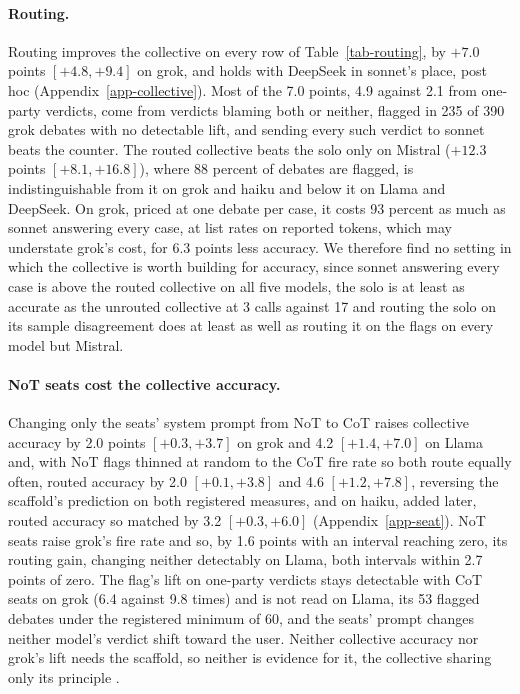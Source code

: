 \paragraph{Routing.}
Routing improves the collective on every row of Table~\ref{tab-routing}, by
$+7.0$ points $[+4.8, +9.4]$ on grok, and
holds with DeepSeek in sonnet's place, post hoc
(Appendix~\ref{app-collective}).
Most of the 7.0 points, 4.9 against 2.1 from one-party verdicts, come from
verdicts blaming both or neither, flagged in 235 of 390 grok debates with no
detectable lift, and sending every such verdict to sonnet beats the counter.
The routed collective beats the solo only on Mistral ($+12.3$
points $[+8.1, +16.8]$), where 88 percent of debates are flagged, is
indistinguishable from it on grok and haiku and below it on Llama and
DeepSeek.
On grok, priced at one debate per case, it costs 93 percent as much as
sonnet answering every case, at list rates on reported tokens, which may
understate grok's cost, for 6.3 points less accuracy.
We therefore find no setting in which the collective is worth building
for accuracy, since sonnet answering every case is above the routed
collective on all five models, the solo is at least as accurate as the
unrouted collective at 3 calls against 17 and routing the solo on its
sample disagreement does at least as well as routing it on the flags on
every model but Mistral.

\paragraph{NoT seats cost the collective accuracy.}
Changing only the seats' system prompt from NoT to CoT raises
collective accuracy by 2.0 points $[+0.3, +3.7]$ on grok and
4.2 $[+1.4, +7.0]$ on Llama and, with NoT flags thinned at random to
the CoT fire rate so both route equally often, routed
accuracy by 2.0 $[+0.1, +3.8]$ and 4.6 $[+1.2, +7.8]$, reversing the
scaffold's prediction on both registered measures, and on haiku, added
later, routed accuracy so matched by 3.2 $[+0.3, +6.0]$ (Appendix~\ref{app-seat}).
NoT seats raise grok's fire rate and so, by 1.6 points with an interval
reaching zero, its routing gain, changing neither detectably
on Llama, both intervals within 2.7 points of zero.
The flag's lift on one-party verdicts stays detectable with CoT seats on
grok (6.4 against 9.8 times) and is not read on Llama, its 53 flagged
debates under the registered minimum of 60, and the seats' prompt changes
neither model's verdict shift toward the user.
Neither collective accuracy nor grok's lift needs the scaffold, so neither
is evidence for it, the collective sharing only its principle
\citep{longino1990science}.


